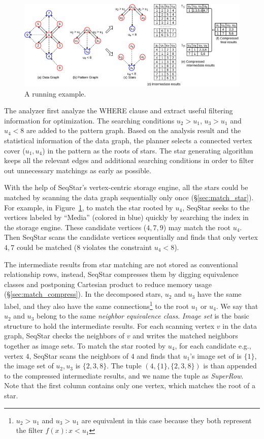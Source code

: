 \begin{figure}[ht]
  \centering
  \includegraphics[width=\textwidth]{img/running_example.pdf}
  \caption{A running example.}\label{img:running_example}
\end{figure}

The analyzer first analyze the WHERE clause and extract useful filtering information for optimization.
The searching conditions $u_2> u_1$, $u_3 > u_1$ and $u_4 < 8$ are added to the pattern graph.
Based on the analysis result and the statistical information of the data graph,
the planner selects a connected vertex cover ($u_1, u_4$) in the pattern as the roots of stars.
The star generating algorithm keeps all the relevant edges and additional searching conditions in order to filter out unnecessary matchings as early as possible.

With the help of SeqStar's vertex-centric storage engine,
all the stars could be matched by scanning the data graph sequentially only once (\S\ref{sec:match_star}).
For example, in Figure~\ref{img:running_example}, to match the star rooted by $u_4$,
SeqStar seeks to the vertices labeled by ``Media'' (colored in blue) quickly by searching the index in the storage engine.
These candidate vertices ($4, 7, 9$) may match the root $u_4$.
Then SeqStar scans the candidate vertices sequentially and finds that only vertex $4, 7$ could be matched ($8$ violates the constraint $u_4 < 8$).

The intermediate results from star matching are not stored as conventional relationship rows,
instead, SeqStar compresses them by digging equivalence classes and postponing Cartesian product to reduce memory usage (\S\ref{sec:match_compress}).
In the decomposed stars, $u_2$ and $u_3$ have the same label, and they also have the same connections\footnote{$u_2 > u_1$ and $u_3 > u_1$ are equivalent in this case because they both represent the filter $f(x): x < u_1$} to the root $u_1$ or $u_4$.
We say that $u_2$ and $u_3$ belong to the same \emph{neighbor equivalence class}.
\emph{Image set} is the basic structure to hold the intermediate results.
For each scanning vertex $v$ in the data graph,
SeqStar checks the neighbors of $v$ and writes the matched neighbors together as image sets.
To match the star rooted by $u_4$,
for each candidate e.g., vertex $4$, SeqStar scans the neighbors of $4$ and finds that $u_1$'s image set of is $\{1\}$,
the image set of $u_2, u_3$ is $\{2, 3, 8\}$.
The tuple $(4, \{1\}, \{2, 3, 8\})$ is than appended to the compressed intermediate results,
and we name the tuple as \emph{SuperRow}.
Note that the first column contains only one vertex, which matches the root of a star.

